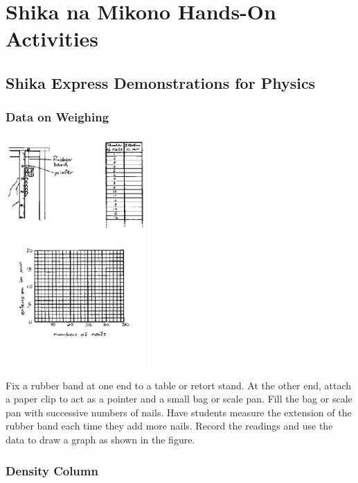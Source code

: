 \setcounter{secnumdepth}{-1}

\chapter{Shika na Mikono Hands-On Activities}

\section{Shika Express Demonstrations for Physics}

\begin{multicols}{2}


\subsection{Data on Weighing}

\begin{center}
\includegraphics[width=0.4\textwidth]{./img/source/meas-mass.png}
\end{center}

Fix a rubber band at one end to a table or retort stand. At the other end, attach a paper clip to act as a pointer and a small bag or scale pan. Fill the bag or scale pan with successive numbers of nails. Have students measure the extension of the rubber band each time they add more nails. Record the readings and use the data to draw a graph as shown in the figure.

\subsection{Density Column}
\label{sub:density-column}


\end{multicols}
